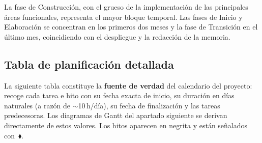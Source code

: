 \documentclass[11pt, a4paper]{article}
\begin{document}
La fase de Construcción, con el grueso de la implementación de las principales áreas funcionales, representa el mayor bloque temporal. Las fases de Inicio y Elaboración se concentran en los primeros dos meses y la fase de Transición en el último mes, coincidiendo con el despliegue y la redacción de la memoria.

\subsection{Tabla de planificación detallada}

La siguiente tabla constituye la \textbf{fuente de verdad} del calendario del proyecto: recoge cada tarea e hito con su fecha exacta de inicio, su duración en días naturales (a razón de $\sim$10\,h/día), su fecha de finalización y las tareas predecesoras. Los diagramas de Gantt del apartado siguiente se derivan directamente de estos valores. Los hitos aparecen en negrita y están señalados con~$\blacklozenge$.
\end{document}

